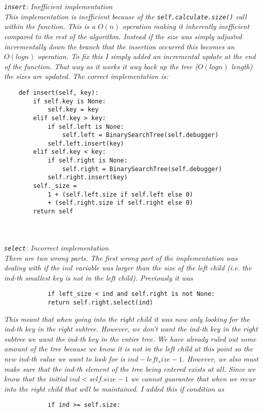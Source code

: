 \documentclass[11pt]{article}
\begin{document}
\begin{enumerate}
\begin{enumerate}
        \textit{\texttt{insert}: Inefficient implementation
        \\ This implementation is inefficient because of the \texttt{self.calculate.size()} call within the function. This is a $O(n)$ operation making it inherently inefficient compared to the rest of the algorithm. Instead if the size was simply adjusted incrementally down the branch that the insertion occurred this becomes an $O(log n)$ operation. To fix this I simply added an incremental update at the end of the function. That way as it works it way back up the tree ($O(log n)$ length) the sizes are updated. The correct implementation is:
        }
        \begin{verbatim}
    def insert(self, key):
        if self.key is None:
            self.key = key
        elif self.key > key: 
            if self.left is None:
                self.left = BinarySearchTree(self.debugger)
            self.left.insert(key)
        elif self.key < key:
            if self.right is None:
                self.right = BinarySearchTree(self.debugger)
            self.right.insert(key)
        self._size = 
            1 + (self.left.size if self.left else 0) 
            + (self.right.size if self.right else 0)
        return self
        \end{verbatim}
        \\\\\textit{\texttt{select}: Incorrect implementation
        \\ There are two wrong parts. The first wrong part of the implementation was dealing with if the $ind$ variable was larger than the size of the left child (i.e. the ind-th smallest key is not in the left child). Previously it was} 
        \begin{verbatim}
            if left_size < ind and self.right is not None:
            return self.right.select(ind)
        \end{verbatim}
        \textit{
        This meant that when going into the right child it was now only looking for the ind-th key in the right subtree. However, we don't want the ind-th key in the right subtree we want the ind-th key in the entire tree. We have already ruled out some amount of the tree because we know it is not in the left child at this point so the new ind-th value we want to look for is $ind - left_size - 1$. 
        However, we also must make sure that the ind-th element of the tree being entered exists at all. Since we know that the initial $ind < self.size - 1$ we cannot guarantee that when we recur into the right child that will be maintained. I added this if condition as }
        \begin{verbatim}
            if ind >= self.size:
        \end{verbatim} 
        

\end{enumerate}
\end{enumerate}
\end{document}

